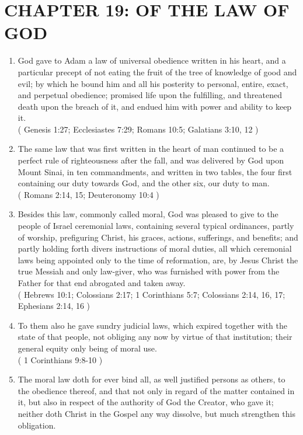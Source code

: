 \documentclass[12pt,a4paper]{book}
\begin{document}
\chapter{CHAPTER 19: OF THE LAW OF GOD}
\label{ch-law-god}
\begin{enumerate}
\item God gave to Adam a law of universal obedience written in his heart, and a particular precept of not eating the fruit of the tree of knowledge of good and evil; by which he bound him and all his posterity to personal, entire, exact, and perpetual obedience; promised life upon the fulfilling, and threatened death upon the breach of it, and endued him with power and ability to keep it.\\
( Genesis 1:27; Ecclesiastes 7:29; Romans 10:5; Galatians 3:10, 12 )
\item The same law that was first written in the heart of man continued to be a perfect rule of righteousness after the fall, and was delivered by God upon Mount Sinai, in ten commandments, and written in two tables, the four first containing our duty towards God, and the other six, our duty to man.\\
( Romans 2:14, 15; Deuteronomy 10:4 )
\item Besides this law, commonly called moral, God was pleased to give to the people of Israel ceremonial laws, containing several typical ordinances, partly of worship, prefiguring Christ, his graces, actions, sufferings, and benefits; and partly holding forth divers instructions of moral duties, all which ceremonial laws being appointed only to the time of reformation, are, by Jesus Christ the true Messiah and only law-giver, who was furnished with power from the Father for that end abrogated and taken away.\\
( Hebrews 10:1; Colossians 2:17; 1 Corinthians 5:7; Colossians 2:14, 16, 17; Ephesians 2:14, 16 )
\item To them also he gave sundry judicial laws, which expired together with the state of that people, not obliging any now by virtue of that institution; their general equity only being of moral use.\\
( 1 Corinthians 9:8-10 )
\item The moral law doth for ever bind all, as well justified persons as others, to the obedience thereof, and that not only in regard of the matter contained in it, but also in respect of the authority of God the Creator, who gave it; neither doth Christ in the Gospel any way dissolve, but much strengthen this obligation.\\

\end{enumerate}
\end{document}

